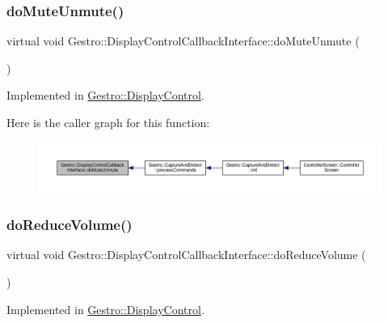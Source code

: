 \subsubsection{\texorpdfstring{do\+Mute\+Unmute()}{doMuteUnmute()}}
{\footnotesize\ttfamily virtual void Gestro\+::\+Display\+Control\+Callback\+Interface\+::do\+Mute\+Unmute (\begin{DoxyParamCaption}{ }\end{DoxyParamCaption})\hspace{0.3cm}{\ttfamily [pure virtual]}}



Implemented in \hyperlink{class_gestro_1_1_display_control_a25f685ea6bf001e53c7d17410f2a24ea}{Gestro\+::\+Display\+Control}.

Here is the caller graph for this function\+:
\nopagebreak
\begin{figure}[H]
\begin{center}
\leavevmode
\includegraphics[width=350pt]{class_gestro_1_1_display_control_callback_interface_ab660632d549760b0404388fc8e86714a_icgraph}
\end{center}
\end{figure}
\mbox{\label{class_gestro_1_1_display_control_callback_interface_a8648fb64585379393917e6b50e348070}} 
\subsubsection{\texorpdfstring{do\+Reduce\+Volume()}{doReduceVolume()}}
{\footnotesize\ttfamily virtual void Gestro\+::\+Display\+Control\+Callback\+Interface\+::do\+Reduce\+Volume (\begin{DoxyParamCaption}{ }\end{DoxyParamCaption})\hspace{0.3cm}{\ttfamily [pure virtual]}}



Implemented in \hyperlink{class_gestro_1_1_display_control_a874fa3f6b3e4cf465db62a4eba1c1dd1}{Gestro\+::\+Display\+Control}.

